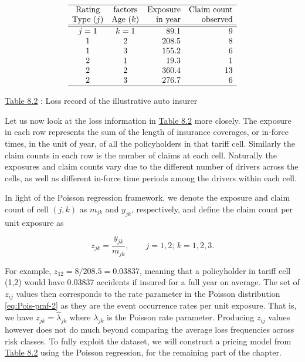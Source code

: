 \documentclass[]{book}
\theoremstyle{definition}
\theoremstyle{definition}
\theoremstyle{definition}
\theoremstyle{remark}
\begin{document}
\[\begin{matrix}
\begin{array}{ccrrc}
 \hline
\text{Rating} &\text{factors}  &   \text{Exposure} & \text{Claim count} \\
\text{Type }(j) & \text{Age }(k) &  \text{in year} & \text{observed}\\
\hline \hline
j=1 & k=1 &  89.1 & 9\\
1 & 2   & 208.5& 8\\
1 & 3  & 155.2 & 6  \\
2  & 1  & 19.3 & 1 \\
2  & 2  & 360.4 & 13 \\
2   & 3  & 276.7 & 6 \\ \hline
\end{array}
\end{matrix}\]

\protect\hyperlink{tab:8.2}{Table 8.2} : Loss record of the illustrative
auto insurer

Let us now look at the loss information in
\protect\hyperlink{tab:8.2}{Table 8.2} more closely. The exposure in
each row represents the sum of the length of insurance coverages, or
in-force times, in the unit of year, of all the policyholders in that
tariff cell. Similarly the claim counts in each row is the number of
claims at each cell. Naturally the exposures and claim counts vary due
to the different number of drivers across the cells, as well as
different in-force time periods among the drivers within each cell.

In light of the Poisson regression framework, we denote the exposure and
claim count of cell \((j,k)\) as \(m_{jk}\) and \(y_{jk}\),
respectively, and define the claim count per unit exposure as

\begin{equation}
\nonumber
z_{jk}= \frac{y_{jk}}{ m_{jk}}, \qquad j=1,2;\, k=1, 2,3.
\end{equation}

For example, \(z_{12}=8/208.5=0.03837\), meaning that a policyholder in
tariff cell (1,2) would have 0.03837 accidents if insured for a full
year on average. The set of \(z_{ij}\) values then corresponds to the
rate parameter in the Poisson distribution \eqref{eq:Pois-pmf-2} as they
are the event occurrence rates per unit exposure. That is, we have
\(z_{jk}=\hat{\lambda}_{jk}\) where \({\lambda}_{jk}\) is the Poisson
rate parameter. Producing \(z_{ij}\) values however does not do much
beyond comparing the average loss frequencies across risk classes. To
fully exploit the dataset, we will construct a pricing model from
\protect\hyperlink{tab:8.2}{Table 8.2} using the Poisson regression, for
the remaining part of the chapter.
\end{document}

